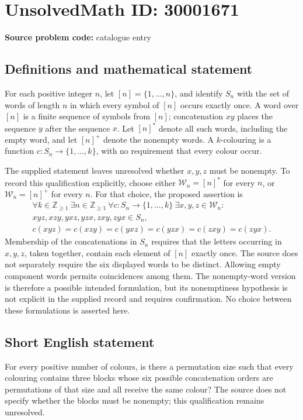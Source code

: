 \documentclass[11pt]{article}
\newcommand{\Z}{\mathbb{Z}}
\begin{document}
\section*{UnsolvedMath ID: 30001671}
\textbf{Source problem code:} catalogue entry
\subsection{Definitions and mathematical statement}
For each positive integer \(n\), let \([n]=\{1,\ldots,n\}\), and identify \(S_n\) with the set of words of length \(n\) in which every symbol of \([n]\) occurs exactly once. A word over \([n]\) is a finite sequence of symbols from \([n]\); concatenation \(xy\) places the sequence \(y\) after the sequence \(x\). Let \([n]^*\) denote all such words, including the empty word, and let \([n]^+\) denote the nonempty words. A \(k\)-colouring is a function \(c:S_n\to\{1,\ldots,k\}\), with no requirement that every colour occur.

The supplied statement leaves unresolved whether \(x,y,z\) must be nonempty. To record this qualification explicitly, choose either \(\mathcal W_n=[n]^*\) for every \(n\), or \(\mathcal W_n=[n]^+\) for every \(n\). For that choice, the proposed assertion is
\[
\begin{gathered}
\forall k\in\Z_{\geq1}\ \exists n\in\Z_{\geq1}\ 
\forall c:S_n\to\{1,\ldots,k\}\ 
\exists x,y,z\in\mathcal W_n:\\
xyz,xzy,yxz,yzx,zxy,zyx\in S_n,\\
c(xyz)=c(xzy)=c(yxz)=c(yzx)=c(zxy)=c(zyx).
\end{gathered}
\]
Membership of the concatenations in \(S_n\) requires that the letters occurring in \(x,y,z\), taken together, contain each element of \([n]\) exactly once. The source does not separately require the six displayed words to be distinct. Allowing empty component words permits coincidences among them. The nonempty-word version is therefore a possible intended formulation, but its nonemptiness hypothesis is not explicit in the supplied record and requires confirmation. No choice between these formulations is asserted here.
\subsection{Short English statement}
For every positive number of colours, is there a permutation size such that every colouring contains three blocks whose six possible concatenation orders are permutations of that size and all receive the same colour? The source does not specify whether the blocks must be nonempty; this qualification remains unresolved.
\end{document}
